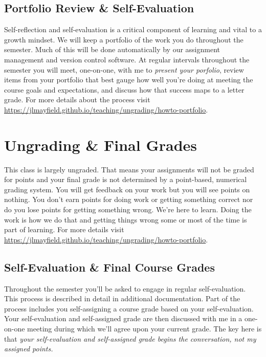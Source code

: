 \documentclass[10pt]{article}
\begin{document}
\subsection*{Portfolio Review \& Self-Evaluation}

Self-reflection and self-evaluation is a critical component of learning and vital to a growth mindset.
We will keep a portfolio of the work you do throughout the semester. Much of this will be done automatically
by our assignment management and version control software. At regular intervals throughout the semester you will meet, one-on-one, with me to \textit{present your porfolio}, review items from your portfolio that best 
gauge how well you're doing at meeting the course goals and expectations, and discuss how that success maps to 
a letter grade. For more details about the process visit \url{https://jlmayfield.github.io/teaching/ungrading/howto-portfolio}.


\section{Ungrading \& Final Grades}

This class is largely ungraded. That means your assignments will not be graded for points and your final grade
is not determined by a point-based, numerical grading system. You will get feedback on your work but you will
see points on nothing. You don't earn points for doing work or getting something correct nor do you lose points
for getting something wrong. We're here to learn. Doing the work is how we do that and getting things wrong
some or most of the time is part of learning. For more details visit \url{https://jlmayfield.github.io/teaching/ungrading/howto-portfolio}.

\subsection{Self-Evaluation \& Final Course Grades}

Throughout the semester you'll be asked to engage in regular self-evaluation. This process is described in
detail in additional documentation. Part of the process includes you self-assigning a course grade based on
your self-evaluation. Your self-evaluation and self-assigned grade are then discussed with me in a one-on-one
meeting during which we'll agree upon your current grade. The key here is that \textit{your self-evaluation
and self-assigned grade begins the conversation, not my assigned points.}
\end{document}
